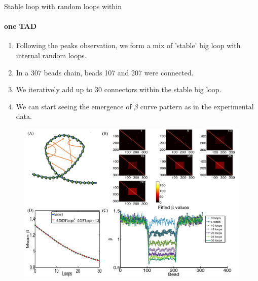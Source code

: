 \documentclass[8pt]{beamer}
\begin{document}
\begin{frame}{Stable loop with random loops within}
\framesubtitle{one TAD}
\begin{enumerate}
\item Following the peaks observation, we form a mix of 'stable' big loop with internal random loops.
\item In a 307 beads chain, beads 107 and 207 were connected.
\item We iteratively add up to 30 connectors within the stable big loop.
\item We can start seeing the emergence of $\beta$ curve pattern as in the experimental data.
\end{enumerate}
\begin{figure}[H]
\includegraphics[scale=0.35]{Figure03_OneTADWithTails0To30RandomLoops}
\end{figure}
\end{frame}
\end{document}
